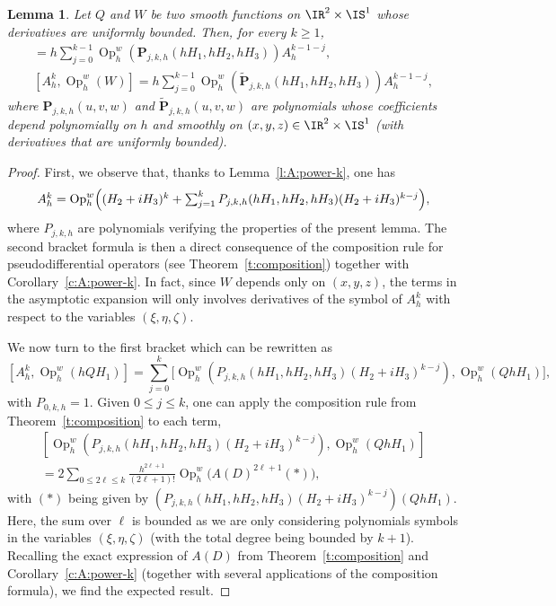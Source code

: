 \documentclass[JEP,XML,SOM,Unicode, NoEqCountersInSection,published]{cedram}
\theoremstyle{plain}
\newtheorem{lemm}[theo]{Lemma}
\theoremstyle{definition}
\theoremstyle{remark}
\newcommand{\Op}{\operatorname{Op}}
\begin{document}
\begin{lemm}\label{l:commute-A-power-k} Let $Q$ and $W$ be two smooth functions on $\IR^2\times\IS^1$ whose derivatives are uniformly bounded. Then, for every $k\geq 1$,
\begin{align*}
[A_h^k,\Op_h^w(hQH_1)]=h\sum_{j=0}^{k-1}\Op_{h}^w(\boldsymbol{P}_{j,k,h}(hH_1,hH_2,hH_3))A_h^{k-1-j},
\\
\tag*{and}
[A_h^k,\Op_h^w(W)]=h\sum_{j=0}^{k-1}\Op_{h}^w(\tilde{\boldsymbol{P}}_{j,k,h}(hH_1,hH_2,hH_3))A_h^{k-1-j},
\end{align*}
where $\boldsymbol{P}_{j,k,h}(u,v,w)$ and $\tilde{\boldsymbol{P}}_{j,k,h}(u,v,w)$ are polynomials whose coefficients depend polynomially on $h$ and smoothly on $(x,y,z)\in \IR^2\times\IS^1$ (with derivatives that are uniformly bounded).
\end{lemm}

\begin{proof} First, we observe that, thanks to Lemma~\ref{l:A:power-k}, one has
\[\textstyle
A_h^k=\Op_h^w\Bigl((H_2+iH_3)^k+\sum_{j=1}^kP_{j,k,h}(hH_1,hH_2,hH_3)(H_2+iH_3)^{k-j}\Bigr),
\]
where $P_{j,k,h}$ are polynomials verifying the properties of the present lemma. The second bracket formula is then a direct consequence of the composition rule for pseudodifferential operators (see Theorem~\ref{t:composition}) together with Corollary~\ref{c:A:power-k}. In fact, since $W$ depends only on $(x,y,z)$, the terms in the asymptotic expansion will only involves derivatives of the symbol of $A_h^k$ with respect to the variables $(\xi,\eta,\zeta)$.

We now turn to the first bracket which can be rewritten as
\[
[A_h^k,\Op_h^w(hQH_1)]=\sum_{j=0}^k\bigl[\Op_h^w\left(P_{j,k,h}(hH_1,hH_2,hH_3)(H_2+iH_3)^{k-j}\right),\Op_h^w(QhH_1)\bigr],
\]
with $P_{0,k,h}=1$.
Given $0\leq j\leq k$, one can apply the composition rule from Theorem~\ref{t:composition} to each term, \ie
\begin{multline*}
\left[\Op_h^w\left(P_{j,k,h}(hH_1,hH_2,hH_3)(H_2+iH_3)^{k-j}\right),\Op_h^w(QhH_1)\right]\\
=2\sum_{0\leq 2\ell\leq k}\frac{h^{2\ell+1}}{(2\ell+1)!}\Op_h^w\bigl(A(D)^{2\ell+1}(*)\bigr),
\end{multline*}
with $(*)$ being given by $(P_{j,k,h}(hH_1,hH_2,hH_3)(H_2+iH_3)^{k-j})(QhH_1)$. Here, the sum over $\ell$ is bounded as we are only considering polynomials symbols in the variables $(\xi,\eta,\zeta)$ (with the total degree being bounded by $k+1$). Recalling the exact expression of $A(D)$ from Theorem~\ref{t:composition} and Corollary~\ref{c:A:power-k} (together with several applications of the composition formula), we find the expected result.
\end{proof}
\end{document}

